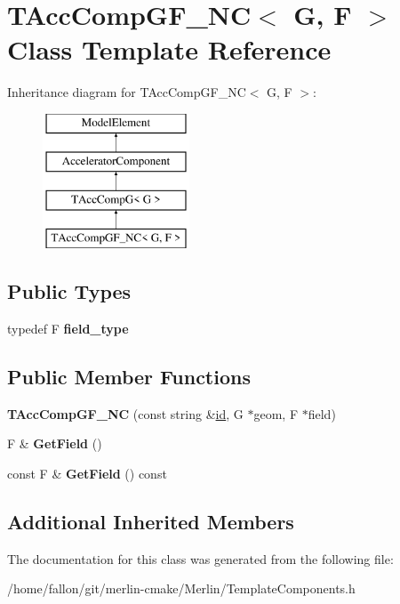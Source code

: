 \hypertarget{classTAccCompGF__NC}{}\section{T\+Acc\+Comp\+G\+F\+\_\+\+NC$<$ G, F $>$ Class Template Reference}
\label{classTAccCompGF__NC}
Inheritance diagram for T\+Acc\+Comp\+G\+F\+\_\+\+NC$<$ G, F $>$\+:\begin{figure}[H]
\begin{center}
\leavevmode
\includegraphics[height=4.000000cm]{classTAccCompGF__NC}
\end{center}
\end{figure}
\subsection*{Public Types}
\begin{DoxyCompactItemize}
\item 
\mbox{\label{classTAccCompGF__NC_ad0b8e0489cd450fe30bada6a5aacb6da}} 
typedef F {\bfseries field\+\_\+type}
\end{DoxyCompactItemize}
\subsection*{Public Member Functions}
\begin{DoxyCompactItemize}
\item 
\mbox{\label{classTAccCompGF__NC_a200f1273475496b788153af9b02f3e6d}} 
{\bfseries T\+Acc\+Comp\+G\+F\+\_\+\+NC} (const string \&\hyperlink{classModelElement_aada171ead2085c75b592cf07d91bc5c2}{id}, G $\ast$geom, F $\ast$field)
\item 
\mbox{\label{classTAccCompGF__NC_a929afc7464e3d7f50a0e43878242ccf6}} 
F \& {\bfseries Get\+Field} ()
\item 
\mbox{\label{classTAccCompGF__NC_ac40d2e0a9cf5b9ac445ba6250b39cdf1}} 
const F \& {\bfseries Get\+Field} () const
\end{DoxyCompactItemize}
\subsection*{Additional Inherited Members}


The documentation for this class was generated from the following file\+:\begin{DoxyCompactItemize}
\item 
/home/fallon/git/merlin-\/cmake/\+Merlin/Template\+Components.\+h\end{DoxyCompactItemize}
